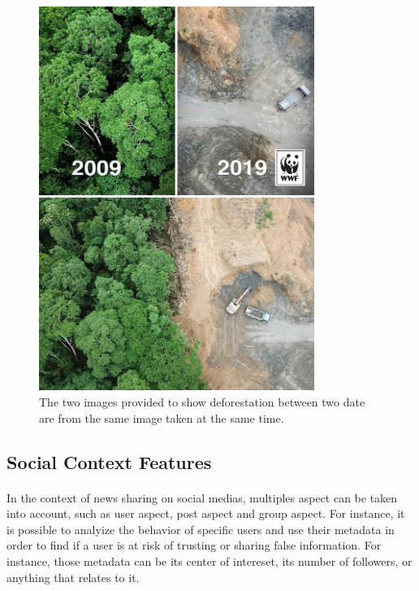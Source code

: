 \begin{figure}
	\centering
	\includegraphics[width=0.8\textwidth]{chapter/images/introduction/fake-news-photos-viral-photoshop-8-5c6fe61f88240__700}
	\caption{The two images provided to show deforestation between two date are from the same image taken at the same time.}
	\label{fig:intro:deforestation}
\end{figure}

\subsection{Social Context Features}
\paragraph{} In the context of news sharing on social medias, multiples aspect can be taken into account, such as user aspect, post aspect and group aspect. For instance, it is possible to analyize the behavior of specific users and use their metadata in order to find if a user is at risk of trusting or sharing false information. For instance, those metadata can be its center of intereset, its number of followers, or anything that relates to it. 

